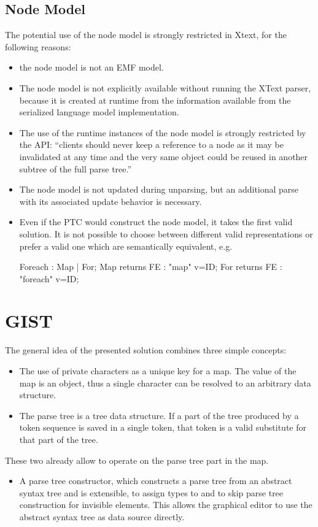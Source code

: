 \subsection{Node Model}
The potential use of the node model is strongly restricted in Xtext, for the following reasons:
\begin{itemize}
	\item the node model is not an EMF model. 
	\item The node model is not explicitly available without running the XText parser, because it is created at runtime from the information available from the serialized language model implementation. 
	\item The use of the runtime instances of the node model is strongly restricted by the API: ``clients should never keep a reference to a node as it may be invalidated at any time and the very same object could be reused in another subtree of the full parse tree.''\cite{XTextAPI}
	\item The node model is not updated during unparsing, but an additional parse with its associated update behavior is necessary.
	\item Even if the PTC would construct the node model, it takes the first valid solution. It is not possible to choose between different valid representations or prefer a valid one which are semantically equivalent, e.g.\begin{xtxt}
Foreach 		: 	Map | For;
Map returns FE  	:  	"map" 		v=ID;
For returns FE  	: 	"foreach"	v=ID;
\end{xtxt}
\end{itemize}


\section{GIST}
The general idea of the presented solution combines three simple concepts:
\begin{itemize}
	\item The use of private characters as a unique key for a map. The value of the map is an object, thus a single character can be resolved to an arbitrary data structure.
	\item The parse tree is a tree data structure. If a part of the tree produced by a token sequence is saved in a single token, that token is a valid substitute for that part of the tree.
\end{itemize}
These two already allow to operate on the parse tree part in the map.
\begin{itemize}
	\item A parse tree constructor, which constructs a parse tree from an abstract syntax tree and is extensible, to assign types to and to skip parse tree construction for invisible elements. This allows the graphical editor to use the abstract syntax tree as data source directly. 
\end{itemize}

